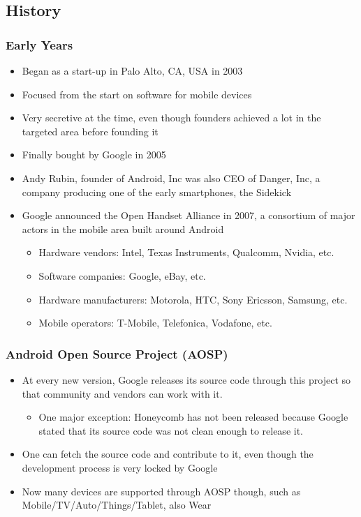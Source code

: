 \subsection{History}
\begin{frame}
  \frametitle{Early Years}
  \begin{itemize}
  \item Began as a start-up in Palo Alto, CA, USA in 2003
  \item Focused from the start on software for mobile devices
  \item Very secretive at the time, even though founders achieved a
    lot in the targeted area before founding it
  \item Finally bought by Google in 2005
  \item Andy Rubin, founder of Android, Inc was also CEO of Danger,
    Inc, a company producing one of the early smartphones, the
    Sidekick
  \item Google announced the Open Handset Alliance in 2007, a
    consortium of major actors in the mobile area built around Android
    \begin{itemize}
    \item Hardware vendors: Intel, Texas Instruments, Qualcomm,
      Nvidia, etc.
    \item Software companies: Google, eBay, etc.
    \item Hardware manufacturers: Motorola, HTC, Sony Ericsson,
      Samsung, etc.
    \item Mobile operators: T-Mobile, Telefonica, Vodafone, etc.
    \end{itemize}
  \end{itemize}
\end{frame}

\begin{frame}
  \frametitle{Android Open Source Project (AOSP)}
  \begin{itemize}
  \item At every new version, Google releases its source code
    through this project so that community and vendors can
    work with it.
    \begin{itemize}
    \item One major exception: Honeycomb has not been released because
      Google stated that its source code was not clean enough to
      release it.
    \end{itemize}
  \item One can fetch the source code and contribute to it, even though
    the development process is very locked by Google
  \item Now many devices are supported through AOSP though, such as Mobile/TV/Auto/Things/Tablet, also Wear
  \end{itemize}
\end{frame}

